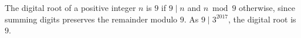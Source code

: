 The digital root of a positive integer $n$ is $9$ if $9\mid n$ and $n\bmod9$ otherwise, since summing digits preserves the remainder modulo $9$. As $9\mid3^{2017}$, the digital root is $\boxed{9}$.
